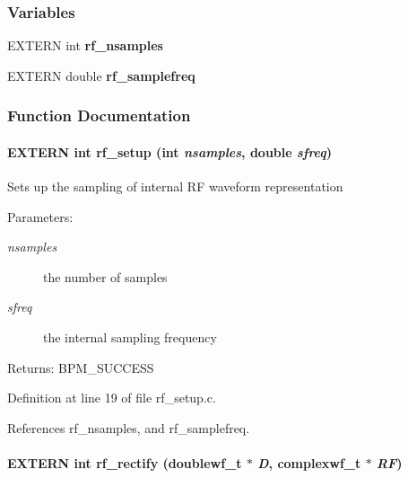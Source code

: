 \subsubsection*{Variables}
\begin{CompactItemize}
\item 
EXTERN int {\bf rf\_\-nsamples}
\item 
EXTERN double {\bf rf\_\-samplefreq}
\end{CompactItemize}


\subsubsection{Function Documentation}
\paragraph[rf\_\-setup]{\setlength{\rightskip}{0pt plus 5cm}EXTERN int rf\_\-setup (int {\em nsamples}, \/  double {\em sfreq})}\hfill\label{group__rf_g1bbbaed6f859da66d484a0de145c5e65}


Sets up the sampling of internal RF waveform representation \begin{Desc}
\item[Parameters:]
\begin{description}
\item[{\em nsamples}]the number of samples \item[{\em sfreq}]the internal sampling frequency\end{description}
\end{Desc}
\begin{Desc}
\item[Returns:]BPM\_\-SUCCESS \end{Desc}


Definition at line 19 of file rf\_\-setup.c.

References rf\_\-nsamples, and rf\_\-samplefreq.
\paragraph[rf\_\-rectify]{\setlength{\rightskip}{0pt plus 5cm}EXTERN int rf\_\-rectify ({\bf doublewf\_\-t} $\ast$ {\em D}, \/  {\bf complexwf\_\-t} $\ast$ {\em RF})}\hfill\label{group__rf_gc7d657690ae444f9e368ca0649a1f996}


